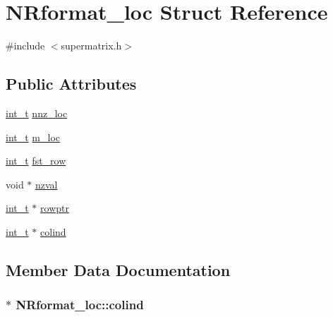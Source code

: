 \hypertarget{structNRformat__loc}{}\section{N\+Rformat\+\_\+loc Struct Reference}
\label{structNRformat__loc}


{\ttfamily \#include $<$supermatrix.\+h$>$}

\subsection*{Public Attributes}
\begin{DoxyCompactItemize}
\item 
\hyperlink{slu__cdefs_8h_ab6fd6105e64ed14a0c9281326f05e623}{int\+\_\+t} \hyperlink{structNRformat__loc_a41c309cb83dedeaa82c0e4e137ea4785}{nnz\+\_\+loc}
\item 
\hyperlink{slu__cdefs_8h_ab6fd6105e64ed14a0c9281326f05e623}{int\+\_\+t} \hyperlink{structNRformat__loc_a90413dc3eb197a83b70cc0d97e4c54af}{m\+\_\+loc}
\item 
\hyperlink{slu__cdefs_8h_ab6fd6105e64ed14a0c9281326f05e623}{int\+\_\+t} \hyperlink{structNRformat__loc_acab0ad4c74c4b4f0c68647f98b430cd9}{fst\+\_\+row}
\item 
void $\ast$ \hyperlink{structNRformat__loc_a08b19d74f15e6475f43565035ae898ca}{nzval}
\item 
\hyperlink{slu__cdefs_8h_ab6fd6105e64ed14a0c9281326f05e623}{int\+\_\+t} $\ast$ \hyperlink{structNRformat__loc_aadd0788ee704ffb7000b0485ee128061}{rowptr}
\item 
\hyperlink{slu__cdefs_8h_ab6fd6105e64ed14a0c9281326f05e623}{int\+\_\+t} $\ast$ \hyperlink{structNRformat__loc_a5d192fc35ba0915afa42f36eca0e2d78}{colind}
\end{DoxyCompactItemize}


\subsection{Member Data Documentation}
\hypertarget{structNRformat__loc_a5d192fc35ba0915afa42f36eca0e2d78}{}
\subsubsection[{colind}]{$\ast$ N\+Rformat\+\_\+loc\+::colind}\label{structNRformat__loc_a5d192fc35ba0915afa42f36eca0e2d78}
\hypertarget{structNRformat__loc_acab0ad4c74c4b4f0c68647f98b430cd9}{}
